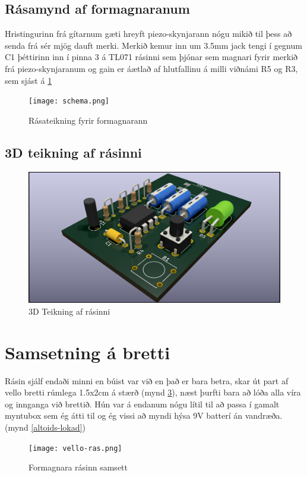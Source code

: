\documentclass{article}
\begin{document}
\subsection{Rásamynd af formagnaranum}
\begin{flushleft}
Hristingurinn frá gítarnum gæti hreyft piezo-skynjarann nógu mikið til þess að senda frá sér mjög dauft merki. Merkið kemur inn um 3.5mm jack tengi í gegnum C1 þéttirinn inn í pinna 3 á TL071 rásinni sem þjónar sem magnari fyrir merkið frá piezo-skynjaranum og gain er áætlað af hlutfallinu á milli viðnámi R5 og R3,  sem sjást á \ref{schematic-preamp}

 \begin{figure}[H]
  	\centering
  	\texttt{[image: schema.png]}
  	\caption{Rásateikning fyrir formagnarann}
 	 \label{schematic-preamp}
\end{figure}
\end{flushleft}

\newpage
\subsection{3D teikning af rásinni}
 \begin{figure}[H]
  	\centering
  	\includegraphics[scale=0.125]{Formagnari-3D.png}
  	\caption{3D Teikning af rásinni}
 	 \label{schematic-preamp-3D}
\end{figure}
\newpage

\section{Samsetning á bretti}
\begin{flushleft}
Rásin sjálf endaði minni en búist var við en það er bara betra, skar út part af vello bretti rúmlega 1.5x2cm á stærð (mynd \ref{vello-ras}), næst þurfti bara að lóða alla víra og innganga við brettið. Hún var á endanum nógu lítil til að passa í gamalt myntubox sem ég átti til og ég vissi að myndi hýsa 9V batterí án vandræða.  (mynd \ref{altoids-lokad})  \par



\end{flushleft}
 \begin{figure}[H]
  	\centering
  	\texttt{[image: vello-ras.png]}
  	\caption{Formagnara rásinn samsett}
 	 \label{vello-ras}
\end{figure}
\end{document}
